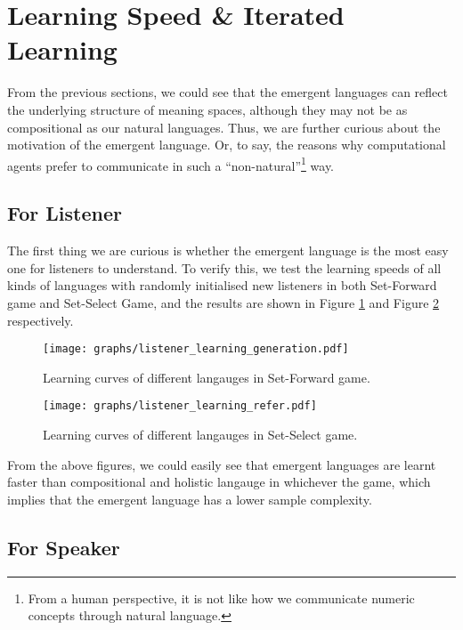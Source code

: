 \section{Learning Speed \& Iterated Learning}
\label{sec4.3:learning_speed}

From the previous sections, we could see that the emergent languages can reflect the underlying structure of meaning spaces, although they may not be as compositional as our natural languages. Thus, we are further curious about the motivation of the emergent language. Or, to say, the reasons why computational agents prefer to communicate in such a ``non-natural''\footnote{From a human perspective, it is not like how we communicate numeric concepts through natural language.} way.

\subsection{For Listener}
\label{ssec4.3.1:learning_listener}

The first thing we are curious is whether the emergent language is the most easy one for listeners to understand. To verify this, we test the learning speeds of all kinds of languages with randomly initialised new listeners in both Set-Forward game and Set-Select Game, and the results are shown in Figure \ref{fig4.1:listener_learning_generation} and Figure \ref{fig4.2:listener_learning_refer} respectively.

\begin{figure}[!h]
    \centering
    \texttt{[image: graphs/listener\_learning\_generation.pdf]}
    \caption{Learning curves of different langauges in Set-Forward game.}
    \label{fig4.1:listener_learning_generation}
\end{figure}

\begin{figure}[!h]
    \centering
    \texttt{[image: graphs/listener\_learning\_refer.pdf]}
    \caption{Learning curves of different langauges in Set-Select game.}
    \label{fig4.2:listener_learning_refer}
\end{figure}

From the above figures, we could easily see that emergent languages are learnt faster than compositional and holistic langauge in whichever the game, which implies that the emergent language has a lower sample complexity\cite{vapnik2013nature}.

\subsection{For Speaker}
\label{ssec4.3.2:learning_speaker}

